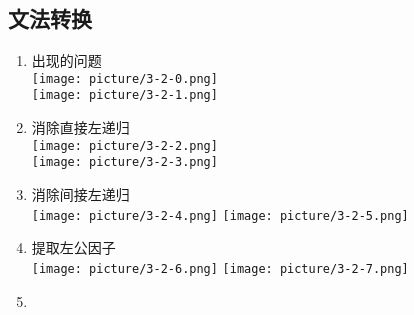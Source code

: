 \documentclass[UTF8]{article}
\begin{document}
		\subsection{文法转换}
		\begin{enumerate}
			\item 出现的问题\\
			\texttt{[image: picture/3-2-0.png]}\\
			\texttt{[image: picture/3-2-1.png]}
			
			\item 消除直接左递归\\
			\texttt{[image: picture/3-2-2.png]}\\
			\texttt{[image: picture/3-2-3.png]}
			
			
			\item 消除间接左递归\\
			\texttt{[image: picture/3-2-4.png]}
			\texttt{[image: picture/3-2-5.png]}
			\item 提取左公因子\\
			\texttt{[image: picture/3-2-6.png]}
			\texttt{[image: picture/3-2-7.png]}
			
			\item 
		\end{enumerate}
		
			
	
\end{document}
